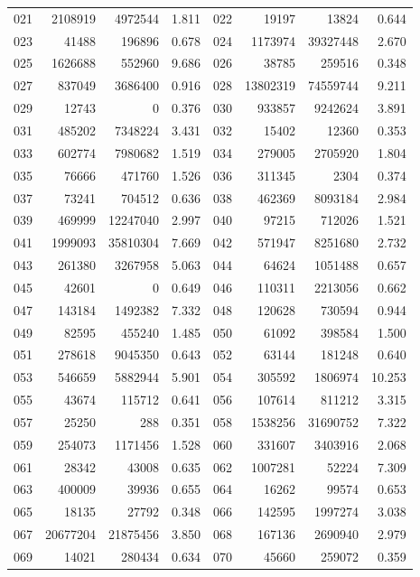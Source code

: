 \begin{longtable}{lrrr@{\hspace{16bp}}lrrr}
021 & 2108919 & 4972544 & 1.811 & 022 & 19197 & 13824 & 0.644\\
023 & 41488 & 196896 & 0.678 & 024 & 1173974 & 39327448 & 2.670\\
025 & 1626688 & 552960 & 9.686 & 026 & 38785 & 259516 & 0.348\\
027 & 837049 & 3686400 & 0.916 & 028 & 13802319 & 74559744 & 9.211\\
029 & 12743 & 0 & 0.376 & 030 & 933857 & 9242624 & 3.891\\
031 & 485202 & 7348224 & 3.431 & 032 & 15402 & 12360 & 0.353\\
033 & 602774 & 7980682 & 1.519 & 034 & 279005 & 2705920 & 1.804\\
035 & 76666 & 471760 & 1.526 & 036 & 311345 & 2304 & 0.374\\
037 & 73241 & 704512 & 0.636 & 038 & 462369 & 8093184 & 2.984\\
039 & 469999 & 12247040 & 2.997 & 040 & 97215 & 712026 & 1.521\\
041 & 1999093 & 35810304 & 7.669 & 042 & 571947 & 8251680 & 2.732\\
043 & 261380 & 3267958 & 5.063 & 044 & 64624 & 1051488 & 0.657\\
045 & 42601 & 0 & 0.649 & 046 & 110311 & 2213056 & 0.662\\
047 & 143184 & 1492382 & 7.332 & 048 & 120628 & 730594 & 0.944\\
049 & 82595 & 455240 & 1.485 & 050 & 61092 & 398584 & 1.500\\
051 & 278618 & 9045350 & 0.643 & 052 & 63144 & 181248 & 0.640\\
053 & 546659 & 5882944 & 5.901 & 054 & 305592 & 1806974 & 10.253\\
055 & 43674 & 115712 & 0.641 & 056 & 107614 & 811212 & 3.315\\
057 & 25250 & 288 & 0.351 & 058 & 1538256 & 31690752 & 7.322\\
059 & 254073 & 1171456 & 1.528 & 060 & 331607 & 3403916 & 2.068\\
061 & 28342 & 43008 & 0.635 & 062 & 1007281 & 52224 & 7.309\\
063 & 400009 & 39936 & 0.655 & 064 & 16262 & 99574 & 0.653\\
065 & 18135 & 27792 & 0.348 & 066 & 142595 & 1997274 & 3.038\\
067 & 20677204 & 21875456 & 3.850 & 068 & 167136 & 2690940 & 2.979\\
069 & 14021 & 280434 & 0.634 & 070 & 45660 & 259072 & 0.359\\

\end{longtable}
